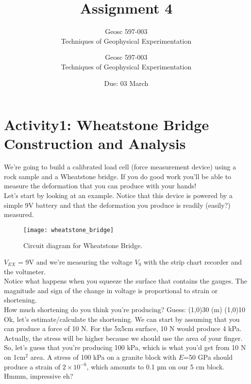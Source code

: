 \documentclass[10pt]{article}
\title{Assignment #1} %
\author{Geosc 597-003 \\
		Techniques of Geophysical Experimentation} %
\date{Due: #2}
\newcommand{\titler}[2]{
	\title{Assignment #1} %
	\author{Geosc 597-003 \\
		Techniques of Geophysical Experimentation} %
	\date{Due: #2}
	
	\maketitle}
\begin{document}

%

\titler{4}{03 March}

\section*{Activity1: Wheatstone Bridge Construction and Analysis}

We’re going to build a calibrated load cell (force measurement device) using a rock sample and a Wheatstone bridge.  If you do good work you’ll be able to measure the deformation that you can produce with your hands!  \\

Let’s start by looking at an example.  Notice that this device is powered by a simple 9V battery and that the deformation you produce is readily (easily?) measured. \\


\begin{figure}[ht]
	\centering
	\texttt{[image: wheatstone\_bridge]}
	\caption{Circuit diagram for Wheatstone Bridge.}
	\label{fig:wheatstone}
\end{figure}
 
$ V_{EX} $ = 9V and we’re measuring the voltage $ V_0 $ with the strip chart recorder and the voltmeter.\\

Notice what happens when you squeeze the surface that contains the gauges. The magnitude and sign of the change in voltage is proportional to strain or shortening.  \\

How much shortening do you think you’re producing? Guess: \line(1,0){30} (m) \line(1,0){10} \\

Ok, let’s estimate/calculate the shortening.  We can start by assuming that you can produce a force of 10 N.  For the 5x5cm surface, 10 N would produce 4 kPa. Actually, the stress will be higher because we should use the area of your finger. So, let’s guess that you’re producing 100 kPa, which is what you’d get from 10 N on 1cm$ ^2 $ area.  A stress of 100 kPa on a granite block with $ E $=50 GPa should produce a strain of $ 2\times 10^{-6} $, which amounts to 0.1 µm on our 5 cm block. Hmmm, impressive eh? \\
\end{document}
